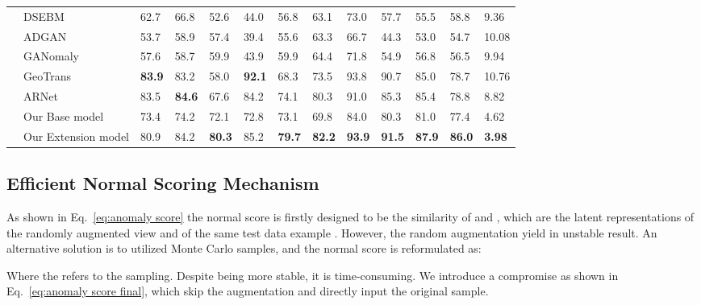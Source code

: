 \documentclass[journal]{IEEEtran}
\theoremstyle{remark}
\begin{document}
\begin{table*}[!htb]
\begin{minipage}[t]{0.92\textwidth}
\begin{tabular}{cx{3.0cm}x{0.7cm}x{0.7cm}x{0.7cm}x{0.7cm}x{0.7cm}x{0.7cm}x{0.7cm}x{0.7cm}x{0.7cm}x{0.7cm}x{0.8cm}}
		& DSEBM~\cite{zong2018deep}  
		& 62.7 & 66.8 & 52.6 & 44.0 & 56.8 & 63.1 & 73.0 & 57.7 & 55.5 & 58.8 & 9.36\\
		& ADGAN~\cite{deecke2018anomaly} 
		& 53.7 & 58.9 & 57.4 & 39.4 & 55.6 & 63.3 & 66.7 & 44.3 & 53.0 & 54.7 & 10.08\\
		& GANomaly~\cite{Akcay2018} 
		& 57.6 & 58.7 & 59.9 & 43.9 & 59.9 & 64.4 & 71.8 & 54.9 & 56.8 & 56.5 & 9.94\\
		& GeoTrans~\cite{golan2018deep} 
		& \textbf{83.9} & 83.2 & 58.0 & \textbf{92.1} & 68.3 & 73.5 & 93.8 & 90.7 & 85.0 & 78.7 & 10.76 \\
		& ARNet~\cite{fye2020ARNet} & 83.5 & \textbf{84.6} & 67.6 & 84.2 & 74.1 & 80.3 & 91.0 & 85.3 & 85.4 & 78.8 & 8.82\\
		\cmidrule(lr){2-2} \cmidrule(lr){3-3} \cmidrule(lr){4-4} \cmidrule(lr){5-5} \cmidrule(lr){6-6} \cmidrule(lr){7-7} \cmidrule(lr){8-8} \cmidrule(lr){9-9} \cmidrule(lr){10-10} \cmidrule(lr){11-11} \cmidrule(lr){12-12} \cmidrule(lr){13-13}
        &Our Base model & 73.4 & 74.2 & 72.1 & 72.8 & 73.1 & 69.8 & 84.0 & 80.3 & 81.0 & 77.4 & 4.62 \\
        & Our Extension model & 80.9 & 84.2 & \textbf{80.3} & 85.2 & \textbf{79.7} & \textbf{82.2} & \textbf{93.9} & \textbf{91.5} & \textbf{87.9} & \textbf{86.0} & \textbf{3.98} \\
		\bottomrule
	\end{tabular}
	\end{minipage}
\label{tal:AUC1}
\end{table*}

\subsection{Efficient Normal Scoring Mechanism}\label{sec:EfficientScoring}

As shown in Eq.~\ref{eq:anomaly score} the normal score is firstly designed to be the similarity of  and , which are the latent representations of the randomly augmented view  and  of the same test data example . However, the random augmentation yield in unstable result. An alternative solution is to utilized Monte Carlo samples, and the normal score is reformulated as:

Where the  refers to the  sampling. Despite being more stable, it is time-consuming. We introduce a compromise as shown in Eq.~\ref{eq:anomaly score final}, which skip the augmentation and directly input the original sample.
\end{document}
